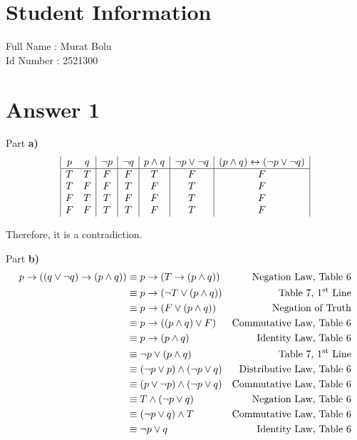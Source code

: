 \documentclass[12pt]{article}
\newcommand\+{\mkern2mu}
\begin{document}
\section*{Student Information }
Full Name : Murat Bolu \\
Id Number : 2521300 \\

\section*{Answer 1}
Part \textbf{a)}
\begin{displaymath}
\begin{array}{|c c|c|c|c|c|c|}
p & q & \lnot p & \lnot q & p \land q & \lnot p \lor \lnot q & (p \land q) \leftrightarrow (\lnot p \lor \lnot q) \\
\hline
T & T & F & F & T & F & F \\
T & F & F & T & F & T & F \\
F & T & T & F & F & T & F \\
F & F & T & T & F & T & F \\
\end{array}
\end{displaymath}
\begin{center}
Therefore, it is a contradiction.
\end{center}

\noindent
Part \textbf{b)}
\begin{align*}
p \to ((q \lor \lnot q) \to (p \land q)) &\equiv p \to (T \to (p \land q)) & \text{Negation Law, Table 6} \\
&\equiv p \to (\lnot T \lor (p \land q)) & \text{Table 7, 1\textsuperscript{st} Line} \\
&\equiv p \to (F \lor (p \land q)) & \text{Negation of Truth} \\
&\equiv p \to ((p \land q) \lor F) & \text{Commutative Law, Table 6} \\
&\equiv p \to (p \land q) & \text{Identity Law, Table 6} \\
&\equiv \lnot p \lor (p \land q) & \text{Table 7, 1\textsuperscript{st} Line} \\
&\equiv (\lnot p \lor p) \land (\lnot p \lor q) & \text{Distributive Law, Table 6} \\
&\equiv (p \lor \lnot p) \land (\lnot p \lor q) & \text{Commutative Law, Table 6} \\
&\equiv T \land (\lnot p \lor q) & \text{Negation Law, Table 6} \\
&\equiv (\lnot p \lor q) \land T & \text{Commutative Law, Table 6} \\
&\equiv \lnot p \lor q & \text{Identity Law, Table 6}
\end{align*}
\end{document}
